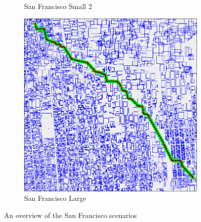 \begin{figure}
\begin{subfigure}[t]{0.46\textwidth}
        		\caption{San Francisco Small 2}
        		\label{fig:sf-small-2}
	\end{subfigure}	
	\par
	\begin{subfigure}[t]{0.8\textwidth}
        		\includegraphics[width=\textwidth]{img/sf-large}
        		\caption{San Francisco Large}
        		\label{fig:sf-large}
	\end{subfigure}
        
    \caption{An overview of the San Francisco scenarios}\label{fig:sf-scens}
\end{figure}

\clearpage
